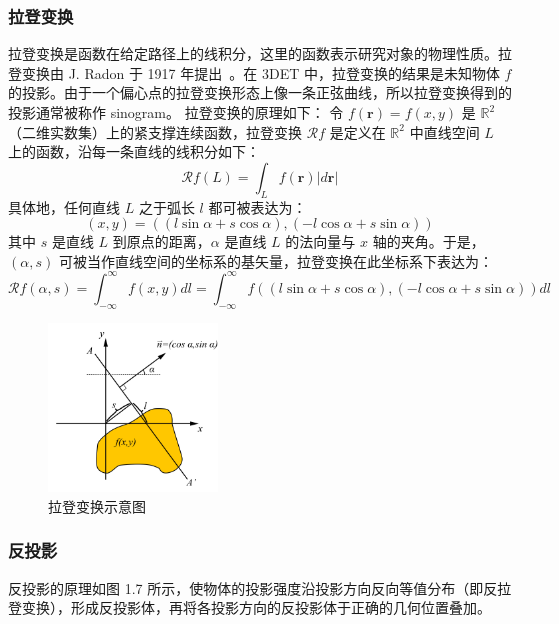 \subsubsection{拉登变换}
拉登变换是函数在给定路径上的线积分，这里的函数表示研究对象的物理性质。拉登变换由 J. Radon 于 1917 年提出~\cite{Radon1917}。在 3DET 中，拉登变换的结果是未知物体 $f$ 的投影。由于一个偏心点的拉登变换形态上像一条正弦曲线，所以拉登变换得到的投影通常被称作 sinogram。
拉登变换的原理如下：
令 $f(\boldsymbol{r})=f(x, y)$ 是 $\mathbb{R}^2$ （二维实数集）上的紧支撑连续函数，拉登变换 $\mathcal{R}f$ 是定义在 $\mathbb{R}^2$ 中直线空间 $L$ 上的函数，沿每一条直线的线积分如下：
\begin{equation}
\mathcal{R}f(L) = \int _L f(\boldsymbol{r})|d\boldsymbol{r}|
\end{equation}
具体地，任何直线 $L$ 之于弧长 $l$ 都可被表达为：
\begin{equation}
\left( x,y \right) = \left( (l\sin\alpha + s \cos\alpha), (-l \cos\alpha + s \sin\alpha)\right)
\end{equation}
其中 $s$ 是直线 $L$ 到原点的距离，$\alpha$ 是直线 $L$ 的法向量与 $x$ 轴的夹角。于是，$(\alpha,s)$ 可被当作直线空间的坐标系的基矢量，拉登变换在此坐标系下表达为：
\begin{equation}
\mathcal{R}f(\alpha,s)= \int_{-\infty}^{\infty}f\left( x,y\right)dl = \int_{-\infty}^{\infty}f\left( (l \sin \alpha + s \cos\alpha),(-l \cos\alpha + s \sin\alpha)\right)dl
\end{equation}

\begin{figure}[htbp]
	\vspace{\baselineskip}
	\centering
	\includegraphics[width=0.4\textwidth]{../1.6/16}
	\caption{拉登变换示意图}\label{fig:16}
	\song{}
\end{figure}

\subsubsection{反投影}
反投影的原理如图 1.7 所示，使物体的投影强度沿投影方向反向等值分布（即反拉登变换），形成反投影体，再将各投影方向的反投影体于正确的几何位置叠加。


